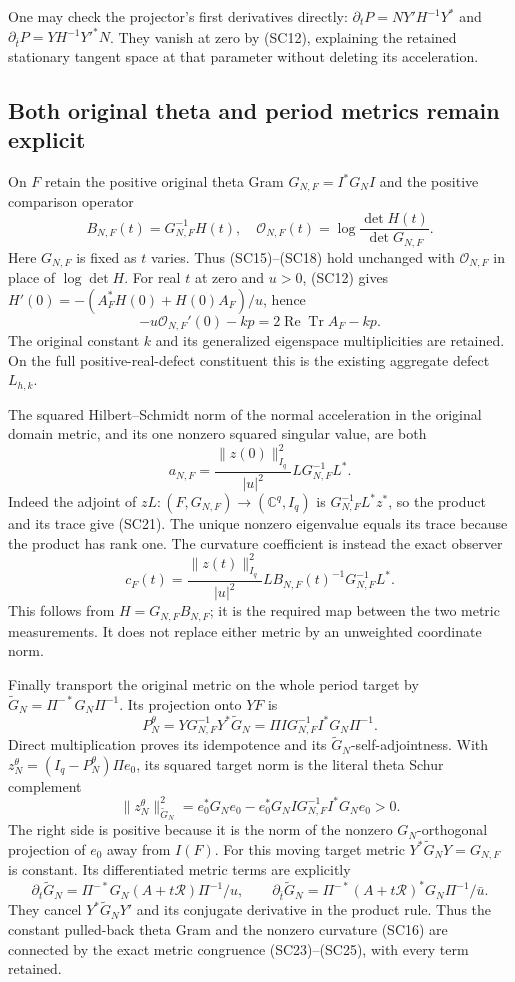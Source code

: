 One may check the projector's first derivatives directly:
$\partial_tP=NY'H^{-1}Y^*$ and
$\partial_{\bar t}P=YH^{-1}Y'^*N$.
They vanish at zero by (SC12), explaining the retained stationary
tangent space at that parameter without deleting its acceleration.

\subsection{Both original theta and period metrics remain explicit}

On $F$ retain the positive original theta Gram
$G_{N,F}=I^*G_NI$ and the positive comparison operator
\[
 B_{N,F}(t)=G_{N,F}^{-1}H(t),\quad
 \mathcal O_{N,F}(t)=\log\frac{\det H(t)}{\det G_{N,F}}.
 \tag{SC19}
\]
Here $G_{N,F}$ is fixed as $t$ varies.  Thus (SC15)--(SC18) hold
unchanged with $\mathcal O_{N,F}$ in place of $\log\det H$.
For real $t$ at zero and $u>0$, (SC12) gives
$H'(0)=-(A_F^*H(0)+H(0)A_F)/u$, hence
\[
 -u\mathcal O_{N,F}'(0)-kp
   =2\operatorname{Re}\operatorname{Tr}A_F-kp.
 \tag{SC20}
\]
The original constant $k$ and its generalized eigenspace multiplicities
are retained.  On the full positive-real-defect constituent this is
the existing aggregate defect $L_{h,k}$.

The squared Hilbert--Schmidt norm of the normal acceleration in the
original domain metric, and its one nonzero squared singular value,
are both
\[
 a_{N,F}=\frac{\|z(0)\|_{I_q}^2}{|u|^2}
              L G_{N,F}^{-1}L^*.
 \tag{SC21}
\]
Indeed the adjoint of $zL:(F,G_{N,F})\to(\mathbb C^q,I_q)$ is
$G_{N,F}^{-1}L^*z^*$, so the product and its trace give (SC21).
The unique nonzero eigenvalue equals its trace because the product
has rank one.  The curvature coefficient is instead the exact observer
\[
 c_F(t)=\frac{\|z(t)\|_{I_q}^2}{|u|^2}
       L B_{N,F}(t)^{-1}G_{N,F}^{-1}L^*.
 \tag{SC22}
\]
This follows from $H=G_{N,F}B_{N,F}$; it is the required map
between the two metric measurements.  It does not replace either
metric by an unweighted coordinate norm.

Finally transport the original metric on the whole period target by
$\widetilde G_N=\Pi^{-*}G_N\Pi^{-1}$.  Its projection onto $YF$ is
\[
 P_N^\theta
   =Y G_{N,F}^{-1}Y^*\widetilde G_N
   =\Pi I G_{N,F}^{-1}I^*G_N\Pi^{-1}.
 \tag{SC23}
\]
Direct multiplication proves its idempotence and its
$\widetilde G_N$-self-adjointness.  With
$z_N^\theta=(I_q-P_N^\theta)\Pi e_0$, its squared target norm is
the literal theta Schur complement
\[
 \|z_N^\theta\|_{\widetilde G_N}^2
   =e_0^*G_Ne_0-e_0^*G_NI G_{N,F}^{-1}I^*G_Ne_0>0.
 \tag{SC24}
\]
The right side is positive because it is the norm of the nonzero
$G_N$-orthogonal projection of $e_0$ away from $I(F)$.
For this moving target metric $Y^*\widetilde G_NY=G_{N,F}$ is
constant.  Its differentiated metric terms are explicitly
\[
 \partial_t\widetilde G_N
       =\Pi^{-*}G_N(A+t\mathcal R)\Pi^{-1}/u,
 \qquad
 \partial_{\bar t}\widetilde G_N
       =\Pi^{-*}(A+t\mathcal R)^*G_N\Pi^{-1}/\bar u.
 \tag{SC25}
\]
They cancel $Y^*\widetilde G_NY'$ and its conjugate derivative in
the product rule.  Thus the constant pulled-back theta Gram and the
nonzero curvature (SC16) are connected by the exact metric
congruence (SC23)--(SC25), with every term retained.

